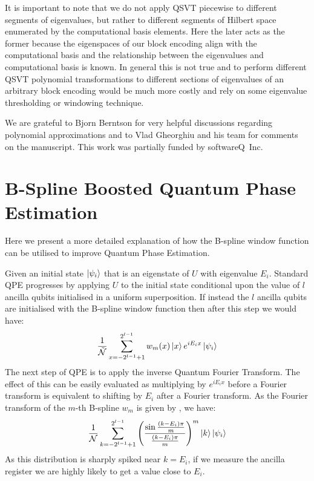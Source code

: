 \documentclass[aps,prx,twocolumn,floatfix,10pt,amssymb,amsfont,amsmath,superscriptaddress,float,nofootinbib,longbibliography,nobalancelastpage]{revtex4-2}
\theoremstyle{empty}
\begin{document}
It is important to note that we do not apply QSVT piecewise to different segments of eigenvalues, but rather to different segments of Hilbert space enumerated by the computational basis elements. Here the later acts as the former because the eigenspaces of our block encoding align with the computational basis and the relationship between the eigenvalues and computational basis is known. In general this is not true and to perform different QSVT polynomial transformations to different sections of eigenvalues of an arbitrary block encoding would be much more costly and rely on some eigenvalue thresholding or windowing technique.
\onecolumngrid
\begin{acknowledgments}
We are grateful to Bjorn Berntson for very helpful discussions regarding polynomial approximations and to Vlad Gheorghiu and his team for comments on the manuscript. This work was partially funded by softwareQ~Inc.
\end{acknowledgments}
\twocolumngrid

\appendix
\section{B-Spline Boosted Quantum Phase Estimation}
\label{section:appendix_a}
Here we present a more detailed explanation of how the B-spline window function can be utilised to improve Quantum Phase Estimation.

Given an initial state $\ket{\psi_i}$ that is an eigenstate of $U$ with eigenvalue $E_i$. Standard QPE progresses by applying $U$ to the initial state conditional upon the value of $l$ ancilla qubits initialised in a uniform superposition. If instead the $l$ ancilla qubits are initialised with the B-spline window function then after this step we would have:
\begin{equation}
    \frac{1}{\tilde{\mathcal{N}}}\sum_{x=-2^{l-1}+1}^{2^{l-1}} w_{m}(x) \ket{x} e^{iE_i x} \ket{\psi_i}
\end{equation}
The next step of QPE is to apply the inverse Quantum Fourier Transform. The effect of this can be easily evaluated as multiplying by $e^{iE_ix}$ before a Fourier transform is equivalent to shifting by $E_i$ after a Fourier transform. As the Fourier transform of the $m$-th B-spline $w_m$ is given by \cite{bspline}, we have:
\begin{equation}
\label{eq:ftb-spline}
        \frac{1}{\mathcal{N}} \sum_{k=-2^{l-1}+1}^{2^{l-1}} \left(\frac{\sin \frac{(k-E_i)\pi}{m}}{ \frac{(k-E_i)\pi}{m}}\right)^m \ket{k}\ket{\psi_i}
\end{equation}
As this distribution is sharply spiked near $k=E_i$, if we measure the ancilla register we are highly likely to get a value close to $E_i$.
\end{document}
